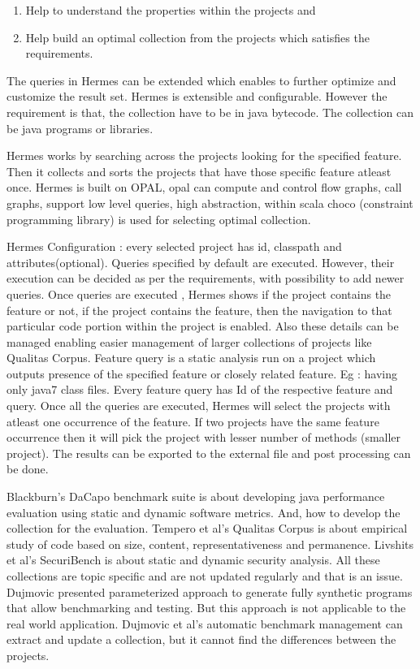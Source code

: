 \documentclass[authoryear,preprint]{sigplanconf}
\begin{document}
\begin{enumerate}
	\item Help to understand the properties within the projects and 
	\item Help build an optimal collection from the projects which satisfies the requirements.
\end{enumerate}

The queries in Hermes can be extended which enables to further optimize and customize the result set. Hermes is extensible and configurable. However the requirement is that, the collection have to be in java bytecode. The collection can be java programs or libraries. 

Hermes works by searching across the projects looking for the specified feature. Then it collects and sorts the projects that have those specific feature atleast once. Hermes is built on OPAL, opal can compute and control flow graphs, call graphs, support low level queries, high abstraction, within scala choco (constraint programming library) is used for selecting optimal collection.

Hermes Configuration : every selected project has id, classpath and attributes(optional). Queries specified by default are executed. However, their execution can be decided as per the requirements, with possibility to add newer queries. Once queries are executed , Hermes shows if the project contains the feature or not, if the project contains the feature, then the navigation to that particular code portion within the project is enabled. Also these details can be managed enabling easier management of larger collections of projects like Qualitas Corpus. Feature query is a static analysis run on a project which outputs presence of the specified feature or closely related feature. Eg : having only java7 class files. Every feature query has Id of the respective feature and query. Once all the queries are executed, Hermes will select the projects with atleast one occurrence of the feature. If two projects have the same feature occurrence then it will pick the project with lesser number of methods (smaller project). The results can be exported to the external file and post processing can be done.

Blackburn’s DaCapo benchmark suite\cite{Blackburn:2006:DBJ:1167473.1167488} is about developing java performance evaluation using static and dynamic software metrics. And, how to develop the collection for the evaluation. Tempero et al’s Qualitas Corpus is about empirical study of code based on size, content, representativeness and permanence. Livshits et al’s SecuriBench\cite{Livshits_defininga} is about static and dynamic security analysis. All these collections are topic specific and are not updated regularly and that is an issue. Dujmovic presented parameterized approach to generate fully synthetic programs that allow benchmarking and testing. But this approach is not applicable to the real world application. Dujmovic et al’s automatic benchmark management\cite{Dujmovic:2010:AGB:1712605.1712654} can extract and update a collection, but it cannot find the differences between the projects.
\end{document}

